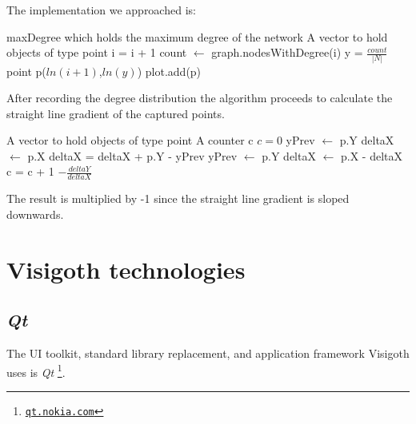 \documentclass[a4paper,11pt,titlepage]{article}
\let\stdhref\href
\renewcommand{\href}[2]{\stdhref{#1}{\texttt{#2}}}
\let\stdsection\section         %
\renewcommand{\section}{\newpage\stdsection}
\newcommand{\buzz}[1]{\emph{#1}}
\newcommand{\myhref}[1]{\href{http://#1}{#1}}
\newcommand{\Qt}{\buzz{Qt} }
\begin{document}
The implementation we approached is:

\begin{algorithmic}
  \REQUIRE maxDegree which holds the maximum degree of the network
  \REQUIRE A vector to hold objects of type point
    \STATE i = i + 1
    \STATE count $\gets$ graph.nodesWithDegree(i)
    \STATE y = $\frac{count}{|N|}$
      \STATE  point p($ln(i+1)$,$ln(y)$)
      \STATE plot.add(p)
    \ENDIF
  \ENDFOR
\end{algorithmic}

After recording the degree distribution the algorithm proceeds to
calculate the straight line gradient of the captured points.

\begin{algorithmic}
  \REQUIRE A vector to hold objects of type point
  \REQUIRE A counter c
  \STATE $c = 0$
      \STATE yPrev $\gets$ p.Y
      \STATE deltaX $\gets$ p.X
    \ELSE
      \STATE deltaX = deltaX + p.Y - yPrev
      \STATE yPrev $\gets$ p.Y
      \STATE deltaX $\gets$ p.X - deltaX
    \ENDIF
      \STATE c = c + 1
  \ENDFOR
  \RETURN $- \frac{deltaY}{deltaX}$
\end{algorithmic}

The result is multiplied by -1 since the straight line
gradient is sloped downwards.




\section{Visigoth technologies}

\subsection{\Qt}
\label{sec:qt}

The UI toolkit, standard library replacement, and application
framework Visigoth uses is \Qt\footnote{\myhref{qt.nokia.com}}.
\end{document}
